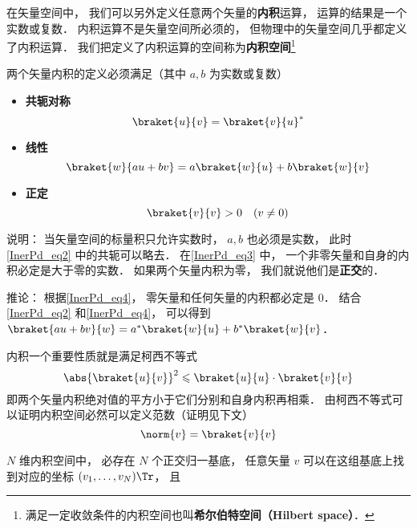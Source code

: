 

在矢量空间中， 我们可以另外定义任意两个矢量的\textbf{内积}运算， 运算的结果是一个实数或复数． 内积运算不是矢量空间所必须的， 但物理中的矢量空间几乎都定义了内积运算． 我们把定义了内积运算的空间称为\textbf{内积空间}\footnote{满足一定收敛条件的内积空间也叫\textbf{希尔伯特空间（Hilbert space）}．}

两个矢量内积的定义必须满足（其中 $a, b$ 为实数或复数）

\begin{itemize}
\item \textbf{共轭对称}
\begin{equation}\label{InerPd_eq2}
\braket{u}{v} = \braket{v}{u}^*
\end{equation}
\item \textbf{线性}
\begin{equation}\label{InerPd_eq4}
\braket{w}{a u + b v} = a\braket{w}{u} + b\braket{w}{v}
\end{equation}
\item \textbf{正定}
\begin{equation}\label{InerPd_eq3}
\braket{v}{v} > 0 \quad (v \ne 0)
\end{equation}
\end{itemize}

说明： 当矢量空间的标量积只允许实数时， $a, b$ 也必须是实数， 此时\autoref{InerPd_eq2} 中的共轭可以略去． 在\autoref{InerPd_eq3} 中， 一个非零矢量和自身的内积必定是大于零的实数． 如果两个矢量内积为零， 我们就说他们是\textbf{正交}的．

推论： 根据\autoref{InerPd_eq4}， 零矢量和任何矢量的内积都必定是 0． 结合\autoref{InerPd_eq2} 和\autoref{InerPd_eq4}， 可以得到 $\braket{a u + b v}{w} = a^*\braket{w}{u} + b^*\braket{w}{v}$．

内积一个重要性质就是满足柯西不等式
\begin{equation}
\abs{\braket{u}{v}}^2 \leqslant \braket{u}{u} \cdot \braket{v}{v}
\end{equation}
即两个矢量内积绝对值的平方小于它们分别和自身内积再相乘． 由柯西不等式可以证明内积空间必然可以定义范数（证明见下文）
\begin{equation}
\norm{v} = \braket{v}{v}
\end{equation}

$N$ 维内积空间中， 必存在 $N$ 个正交归一基底， 任意矢量 $v$ 可以在这组基底上找到对应的坐标 $(v_1, \dots, v_N)\Tr$， 且

